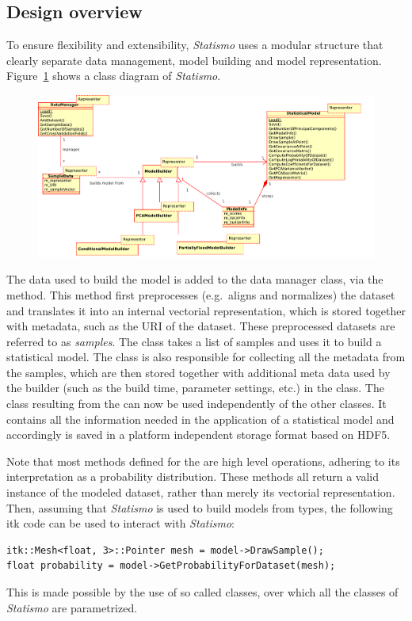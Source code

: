 \documentclass{InsightArticle}
\newcommand{\Statismo}{\emph{Statismo}\xspace}
\begin{document}
\subsection{Design overview}\label{sec:design-overview}
To ensure flexibility and  extensibility, \Statismo uses a modular structure that clearly separate 
data management, model building and model representation. 
Figure~\ref{fig:class-diagram} shows a class diagram of \Statismo.
\begin{figure}
  \includegraphics[width=\textwidth]{pictures/class_diagram.pdf}
  \itkcaption{The core classes in \Statismo}
  \label{fig:class-diagram}
\end{figure}
The data used to build the model is added to the data manager
 class, via the  method. This
method first preprocesses (e.g.\ aligns and normalizes) the dataset
and translates it into an internal vectorial representation, which is
stored together with metadata, such as the URI of the dataset. These
preprocessed datasets are referred to as \emph{samples}. The
 class takes a list of samples and uses it to build
a statistical model. The  class is also responsible
for collecting all the metadata from the samples, which are then
stored together with additional meta data used by the builder (such as
the build time, parameter settings, etc.) in the 
class. The  class resulting from the
 can now be used independently of the other
classes. It contains all the information needed in the application of
a statistical model and accordingly is saved in a platform independent storage format 
based on HDF5. 

Note that most methods defined for the
 are high level operations, adhering to its
interpretation as a probability distribution. 
These methods all return a valid instance of the modeled dataset, rather than 
merely its vectorial representation. 
Then, assuming that \Statismo is used to build models from  types, 
the following itk code can be used to 
interact with \Statismo:
\begin{verbatim}
itk::Mesh<float, 3>::Pointer mesh = model->DrawSample();
float probability = model->GetProbabilityForDataset(mesh);
\end{verbatim}
This is made possible by the use of so called  classes, over which all the 
classes of \Statismo are parametrized.
\end{document}
